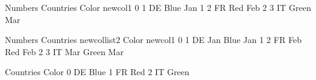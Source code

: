 \documentclass[letterpaper,10pt,english]{jupyterBook}
\begin{document}
\begin{sphinxVerbatim}[commandchars=\\\{\}]
  \PYG{p}{[}\PYG{p}{]}
\PYG{p}{[}\PYG{p}{]}  
\end{sphinxVerbatim}

\begin{sphinxVerbatim}[commandchars=\\\{\}]
   Numbers Countries  Color new\PYGZus{}col1
0        1        DE   Blue      Jan
1        2        FR    Red      Feb
2        3        IT  Green      Mar
\end{sphinxVerbatim}

\begin{sphinxVerbatim}[commandchars=\\\{\}]
 
\end{sphinxVerbatim}

\begin{sphinxVerbatim}[commandchars=\\\{\}]
   Numbers Countries new\PYGZus{}col\PYGZus{}list2  Color new\PYGZus{}col1
0        1        DE           Jan   Blue      Jan
1        2        FR           Feb    Red      Feb
2        3        IT           Mar  Green      Mar
\end{sphinxVerbatim}

\begin{sphinxVerbatim}[commandchars=\\\{\}]
\PYG{p}{[}\PYG{p}{]}
\end{sphinxVerbatim}

\begin{sphinxVerbatim}[commandchars=\\\{\}]
  Countries  Color
0        DE   Blue
1        FR    Red
2        IT  Green
\end{sphinxVerbatim}
\end{document}

